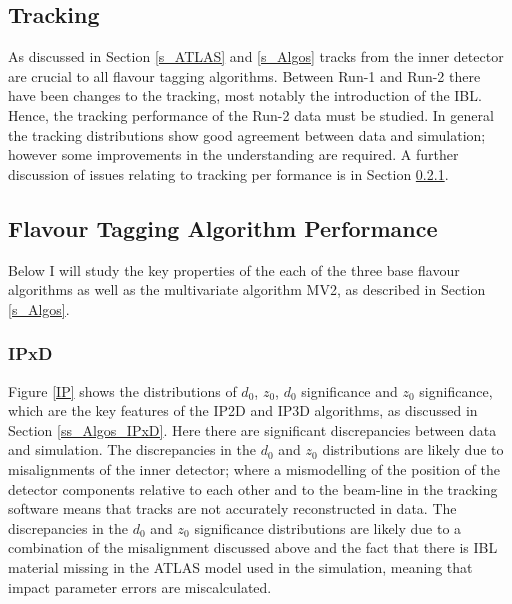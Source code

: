 \documentclass[12pt, onecolumn,notitlepage]{article}
\begin{document}
\subsection{Tracking}

As discussed in Section \ref{s_ATLAS} and \ref{s_Algos} tracks from the inner detector are crucial to all flavour tagging algorithms.
Between Run-1 and Run-2 there have been changes to the tracking, most notably the introduction of the IBL.
Hence, the tracking performance of the Run-2 data must be studied.
In general the tracking distributions show good agreement between data and simulation; however some improvements in the understanding are required.
A further discussion of issues relating to tracking per
formance is in Section \ref{sss_comm_perf_IPxD}.


\subsection{Flavour Tagging Algorithm Performance} \label{ss_comm_perf}

Below I will study the key properties of the each of the three base flavour algorithms as well as the multivariate algorithm MV2, as described in Section \ref{s_Algos}.

\subsubsection{IPxD} \label{sss_comm_perf_IPxD}

Figure \ref{IP} shows the distributions of $d_0$, $z_0$, $d_0$ significance and $z_0$ significance, which are the key features of the IP2D and IP3D algorithms,
as discussed in Section \ref{ss_Algos_IPxD}.
Here there are significant discrepancies between data and simulation. 
The discrepancies in the $d_0$ and $z_0$ distributions are likely due to misalignments of the inner detector; 
where a mismodelling of the position of the detector components relative to each other and to the beam-line in the tracking software 
means that tracks are not accurately reconstructed in data.
The discrepancies in the $d_0$ and $z_0$ significance distributions are likely due to a combination of the misalignment discussed above
and the fact that there is IBL material missing in the ATLAS model used in the simulation, meaning that impact parameter errors are miscalculated.
\end{document}
